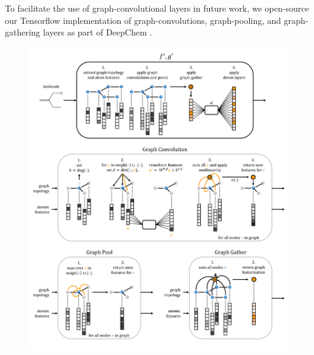 \documentclass[journal=jacsat,manuscript=article]{achemso}
\providecommand{\DIFaddbegin}{} %
\providecommand{\DIFaddend}{} %
\providecommand{\DIFdelbegin}{} %
\providecommand{\DIFdelend}{} %
\begin{document}
To facilitate the use of graph-convolutional layers in future work, we open-source our Tensorflow\cite{abadi2016tensorflow} implementation of graph-convolutions, graph-pooling, and graph-gathering layers as part of DeepChem \cite{ram2016}.

\begin{figure}[H]
\includegraphics[width=\textwidth]{graphconv_graphic_v2.png}
\label{conv}
\end{figure}

\end{document}
